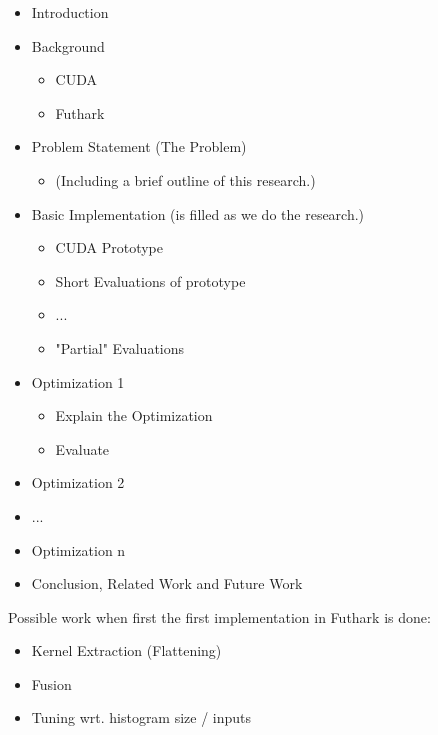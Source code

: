 %
\begin{itemize}
  \item Introduction
  \item Background
  \begin{itemize}
    \item CUDA
    \item Futhark
  \end{itemize}
  \item Problem Statement (The Problem)
  \begin{itemize}
    \item (Including a brief outline of this research.)
  \end{itemize}
  \item Basic Implementation (is filled as we do the research.)
  \begin{itemize}
    \item CUDA Prototype
    \item Short Evaluations of prototype
    \item ...
    \item "Partial" Evaluations
  \end{itemize}
  \item Optimization 1
  \begin{itemize}
    \item Explain the Optimization
    \item Evaluate
  \end{itemize}
  \item Optimization 2
  \item ...
  \item Optimization n
  \item Conclusion, Related Work and Future Work
\end{itemize}
%
Possible work when first the first implementation in
Futhark is done:
%
\begin{itemize}
  \item Kernel Extraction (Flattening)
  \item Fusion
  \item Tuning wrt. histogram size / inputs
\end{itemize}
%
